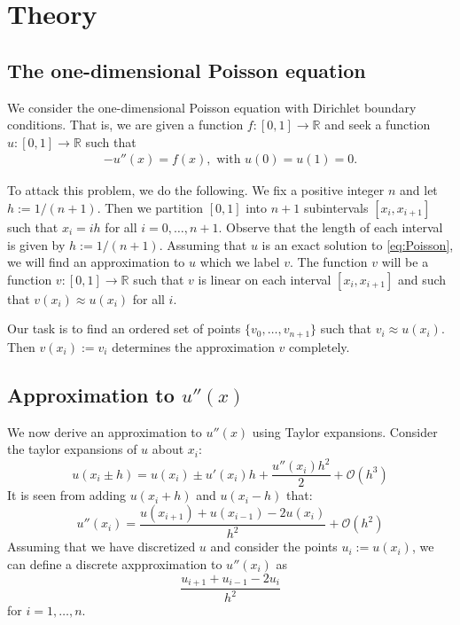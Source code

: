 \documentclass[a4paper,10pt]{scrartcl}\sloppy
\theoremstyle{definition}
\begin{document}
\section{Theory}

\subsection{The one-dimensional Poisson equation}
We consider the one-dimensional Poisson equation with Dirichlet boundary conditions. That is, we are given a function $f\colon [0,1]\rightarrow \mathbb{R}$ and seek a function $u\colon [0,1]\rightarrow \mathbb{R}$ such that
\begin{align}\label{eq:Poisson}
-u''(x)=f(x), \textrm{ with } u(0)=u(1)=0.
\end{align}

To attack this problem, we do the following. We fix a positive integer $n$ and let $h:= 1/(n+1)$. Then we partition $[0,1]$ into $n+1$ subintervals $[x_i,x_{i+1}]$ such that $x_i=ih$ for all $i=0,\ldots,n+1$. Observe that the length of each interval is given by $h:= 1/(n+1)$. Assuming that $u$ is an exact solution to \cref{eq:Poisson}, we will find an approximation to $u$ which we label $v$. The function $v$ will be a function $v\colon [0,1]\rightarrow \mathbb{R}$ such that $v$ is linear on each interval $[x_i,x_{i+1}]$ and such that $v(x_i)\approx u(x_i)$ for all $i$. 
 
 Our task is to find an ordered set of points $\{v_0,\ldots,v_{n+1}\}$ such that $v_i\approx u(x_i)$. Then $v(x_i):= v_i$ determines the approximation $v$ completely.
 
 
 




\subsection{Approximation to $u''(x)$}
We now derive an approximation to $u''(x)$ using Taylor expansions. Consider the taylor expansions of $u$ about $x_i$:
$$u(x_i\pm h)= u(x_i) \pm u'(x_i)h + \frac{u''(x_i)h^2}{2}+\mathcal{O}(h^3)$$
It is seen from adding $u(x_i+h)$ and $u(x_i-h)$ that:
$$u''(x_i)=\frac{u(x_{i+1})+u(x_{i-1})-2u(x_i)}{h^2}+ \mathcal{O}(h^2)$$
Assuming that we have discretized $u$ and consider the points $u_i:=u(x_i)$, we can define a discrete axpproximation to $u''(x_i)$ as
$$\frac{u_{i+1}+u_{i-1}-2u_i}{h^2}$$
\noindent for $i=1,\ldots, n$.
\end{document}
